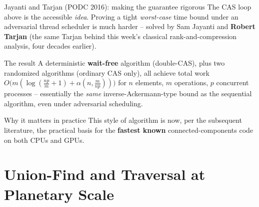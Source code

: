 \documentclass[11pt,aspectratio=169]{beamer}
\begin{document}
\begin{frame}{Jayanti and Tarjan (PODC 2016): making the guarantee rigorous}
  \small
  The CAS loop above is the accessible \emph{idea}. Proving a tight
  \emph{worst-case} time bound under an adversarial thread scheduler is much harder --
  solved by Sam Jayanti and \textbf{Robert Tarjan} (the same Tarjan behind this week's
  classical rank-and-compression analysis, four decades earlier).
  \begin{block}{The result}
    A deterministic \textbf{wait-free} algorithm (double-CAS), plus two randomized
    algorithms (ordinary CAS only), all achieve total work
    $O\big(m(\log(\tfrac{np}{m}+1) + \alpha(n,\tfrac{m}{np}))\big)$
    for $n$ elements, $m$ operations, $p$ concurrent processes -- essentially the
    \emph{same} inverse-Ackermann-type bound as the sequential algorithm, even under
    adversarial scheduling.
  \end{block}
  \begin{exampleblock}{Why it matters in practice}
    This style of algorithm is now, per the subsequent literature, the practical basis
    for the \textbf{fastest known} connected-components code on both CPUs and GPUs.
  \end{exampleblock}
\end{frame}

\section{Union-Find and Traversal at Planetary Scale}
\end{document}
